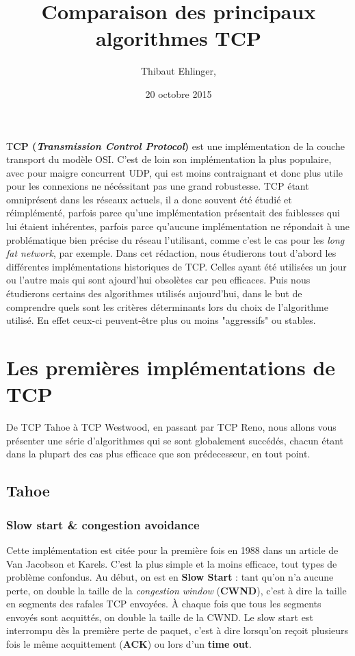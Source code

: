 \documentclass[	DIV=calc,%
							paper=a4,%
							fontsize=11pt,%
							twocolumn]{scrartcl}	 					%
\title{Comparaison des principaux algorithmes TCP}					%
\author{Thibaut Ehlinger, }											%
\date{20 octobre 2015}
\newcommand{\initial}[1]{%
     \lettrine[lines=3,lhang=0.3,nindent=0em]{
     				\color{DarkGoldenrod}
     				{\textsf{#1}}}{}}
\begin{document}
\maketitle
\thispagestyle{fancy} 			%
\initial{T}\textbf{CP (\textit{Transmission Control Protocol})} est une implémentation de la couche transport du modèle OSI. C'est de loin son implémentation la plus populaire, avec pour maigre concurrent UDP, qui est moins contraignant et donc plus utile pour les connexions ne nécéssitant pas une grand robustesse. TCP étant omniprésent dans les réseaux actuels, il a donc souvent été étudié et réimplémenté, parfois parce qu'une implémentation présentait des faiblesses qui lui étaient inhérentes, parfois parce qu'aucune implémentation ne répondait à une problématique bien précise du réseau l'utilisant, comme c'est le cas pour les \textit{long fat network}, par exemple. Dans cet rédaction, nous étudierons tout d'abord les différentes implémentations historiques de TCP. Celles ayant été utilisées un jour ou l'autre mais qui sont ajourd'hui obsolètes car peu efficaces. Puis nous étudierons certains des algorithmes utilisés aujourd'hui, dans le but de comprendre quels sont les critères déterminants lors du choix de l'algorithme utilisé. En effet ceux-ci peuvent-être plus ou moins "aggressifs" ou stables.

\section*{Les premières implémentations de TCP}
De TCP Tahoe à TCP Westwood, en passant par TCP Reno, nous allons vous présenter une série d'algorithmes qui se sont globalement succédés, chacun étant dans la plupart des cas plus efficace que son prédecesseur, en tout point.

\subsection*{Tahoe}
\subsubsection*{Slow start \& congestion avoidance}
Cette implémentation est citée pour la première fois en 1988 dans un article de Van Jacobson et Karels. C'est la plus simple et la moins efficace, tout types de problème confondus. Au début, on est en \textbf{Slow Start} : tant qu'on n'a aucune perte, on double la taille de la \textit{congestion window} (\textbf{CWND}), c'est à dire la taille en segments des rafales TCP envoyées. À chaque fois que tous les segments envoyés sont acquittés, on double la taille de la CWND. Le slow start est interrompu dès la première perte de paquet, c'est à dire lorsqu'on reçoit plusieurs fois le même acquittement (\textbf{ACK}) ou lors d'un \textbf{time out}. 
\end{document}

